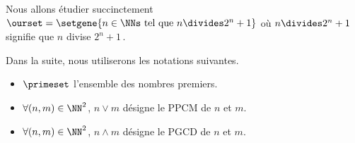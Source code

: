 Nous allons étudier succinctement
$\ourset = \setgene{n \in \NNs \text{ tel que } n \divides 2^n + 1}$
où $n \divides 2^n + 1$ signifie que $n$ divise $2^n + 1$\,.

\medskip

Dans la suite, nous utiliserons les notations suivantes.
\begin{itemize}
	\item $\primeset$ l'ensemble des nombres premiers.
	
	\item $\forall (n , m) \in \NN^2$, $n \vee m$ désigne le PPCM de $n$ et $m$.

	\item $\forall (n , m) \in \NN^2$, $n \wedge m$ désigne le PGCD de $n$ et $m$.
\end{itemize}